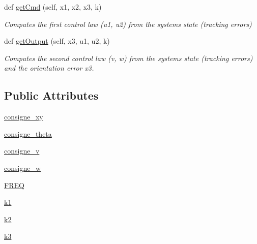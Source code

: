 \begin{DoxyCompactItemize}
def \hyperlink{classcmd__TTB_1_1controllers_1_1TrajectoryStabilisator_a554b57b36fcb2f9f1d0b87058ed9992e}{get\+Cmd} (self, x1, x2, x3, k)
\begin{DoxyCompactList}\small\item\em Computes the first control law (u1, u2) from the system\textquotesingle{}s state (tracking errors) \end{DoxyCompactList}\item 
def \hyperlink{classcmd__TTB_1_1controllers_1_1TrajectoryStabilisator_a273938caf148ebbb4f720dec76dc3aa2}{get\+Output} (self, x3, u1, u2, k)
\begin{DoxyCompactList}\small\item\em Computes the second control law (v, w) from the system\textquotesingle{}s state (tracking errors) and the orientation error x3. \end{DoxyCompactList}\end{DoxyCompactItemize}
\subsection*{Public Attributes}
\begin{DoxyCompactItemize}
\item 
\hyperlink{classcmd__TTB_1_1controllers_1_1TrajectoryStabilisator_a6eb1c01d0f7628c9c55aba2e1c1a5f87}{consigne\+\_\+xy}
\item 
\hyperlink{classcmd__TTB_1_1controllers_1_1TrajectoryStabilisator_a8a5025ec66995976f3c7bd6d976cb426}{consigne\+\_\+theta}
\item 
\hyperlink{classcmd__TTB_1_1controllers_1_1TrajectoryStabilisator_a7aacf24b292c214b7507ed7ff775d9d8}{consigne\+\_\+v}
\item 
\hyperlink{classcmd__TTB_1_1controllers_1_1TrajectoryStabilisator_a66ceabf25b6fc0f738457520d8a6b72d}{consigne\+\_\+w}
\item 
\hyperlink{classcmd__TTB_1_1controllers_1_1TrajectoryStabilisator_aedda44c52c85b3984f4c58b4d6157575}{F\+R\+EQ}
\item 
\hyperlink{classcmd__TTB_1_1controllers_1_1TrajectoryStabilisator_a82d3c2d639861e91f72560750417920e}{k1}
\item 
\hyperlink{classcmd__TTB_1_1controllers_1_1TrajectoryStabilisator_af96b6610b96e8a7d036848bf168c2c01}{k2}
\item 
\hyperlink{classcmd__TTB_1_1controllers_1_1TrajectoryStabilisator_abe267c474aea918130fd31fdfe818938}{k3}
\end{DoxyCompactItemize}


